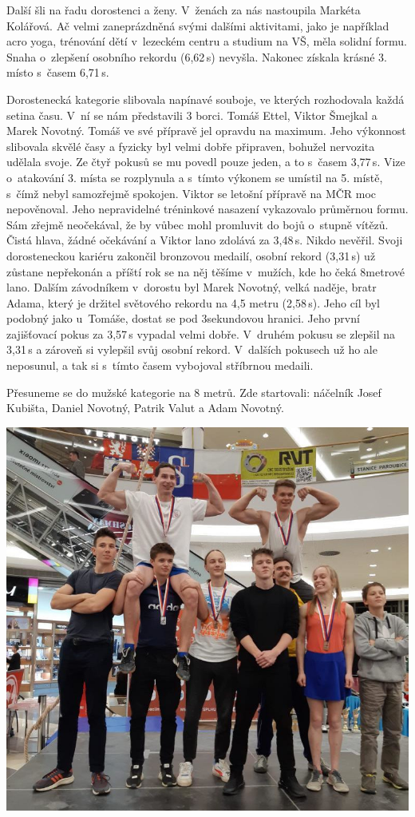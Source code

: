 \documentclass[11pt]{article}
\begin{document}
Další šli na řadu dorostenci a ženy. V~ženách za nás nastoupila Markéta Kolářová. Ač velmi zaneprázdněná svými dalšími aktivitami, jako je například acro yoga, trénování dětí v~lezeckém centru  a studium na VŠ, měla solidní formu. Snaha o~zlepšení osobního rekordu (6,62\,s) nevyšla. Nakonec získala krásné 3. místo s~časem 6,71\,s.

Dorostenecká kategorie slibovala napínavé souboje, ve kterých rozhodovala každá setina času. V~ní se nám představili 3 borci. Tomáš Ettel, Viktor Šmejkal a Marek Novotný. Tomáš ve své přípravě jel opravdu na maximum. Jeho výkonnost slibovala skvělé časy a fyzicky byl velmi dobře připraven, bohužel nervozita udělala svoje. Ze čtyř pokusů se mu povedl pouze jeden, a to s~časem 3,77\,s. Vize o~atakování 3. místa se rozplynula a s~tímto výkonem se umístil na 5. místě, s~čímž nebyl samozřejmě spokojen. Viktor se letošní přípravě na MČR moc nepověnoval. Jeho nepravidelné tréninkové nasazení vykazovalo průměrnou formu. Sám zřejmě neočekával, že by vůbec mohl promluvit do bojů o~stupně vítězů. Čistá hlava, žádné očekávání a Viktor lano zdolává za 3,48\,s. Nikdo nevěřil. Svoji dorosteneckou kariéru zakončil bronzovou medailí, osobní rekord (3,31\,s) už zůstane nepřekonán a příští rok se na něj těšíme v~mužích, kde ho čeká 8metrové lano. Dalším závodníkem v~dorostu byl Marek Novotný, velká naděje, bratr Adama, který je držitel světového rekordu na 4,5 metru (2,58\,s). Jeho cíl byl podobný jako u~Tomáše, dostat se pod 3sekundovou hranici. Jeho první zajišťovací pokus za 3,57\,s vypadal velmi dobře. V~druhém pokusu se zlepšil na 3,31\,s a zároveň si vylepšil svůj osobní rekord. V~dalších pokusech už ho ale neposunul, a tak si s~tímto časem vybojoval stříbrnou medaili.

Přesuneme se do mužské kategorie na 8 metrů. Zde startovali: náčelník Josef Kubišta, Daniel Novotný, Patrik Valut a Adam Novotný.

\vspace*{12pt}

\noindent\includegraphics*[width=\linewidth]{splh_foto.jpg}
\end{document}
